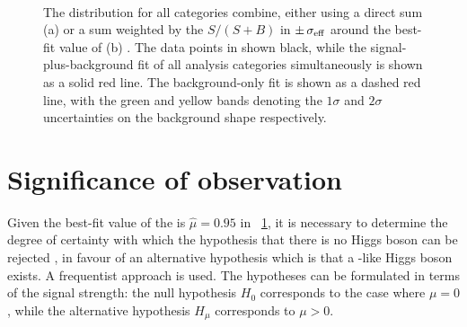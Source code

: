 \begin{figure}[ht!]
\label{fig:statandresults:s_b_fits_bis}
\end{figure}

\begin{figure}[ht!]
\centering
{}\\
\caption{The \mgg distribution for all categories combine, either using a direct sum (a) or a sum weighted by the $S/(S+B)$ in $\pm \,\sigma_{\text{eff}}$ around the best-fit value of \mH (b) . The data points in shown black, while the signal-plus-background fit of all analysis categories simultaneously is shown as a solid red line. The background-only fit is shown as a dashed red line, with the green and yellow bands denoting the $1\sigma$ and $2\sigma$ uncertainties on the background shape respectively.}

\label{fig:statandresults:s_b_fits_sum}
\end{figure}


\section{Significance of observation}


Given the best-fit value of the \POI \mu is $\hat{\mu}= 0.95$ in \Sec~\ref{}, it is necessary to determine the degree of certainty with which the hypothesis that there is no Higgs boson can be rejected , in favour of an alternative hypothesis which is that a \SM-like Higgs boson exists. A frequentist approach is used. The hypotheses can be formulated in terms of the signal strength: the null hypothesis $H_{0}$ corresponds to the case where $\mu=0$, while the alternative hypothesis $H_{\mu}$ corresponds to $\mu > 0$. 

